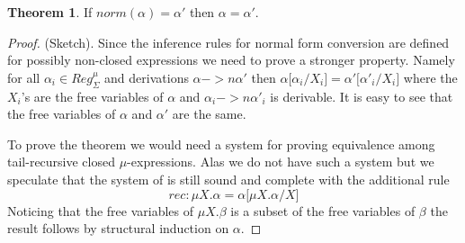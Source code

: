 \documentclass[a4paper, oneside]{memoir}
\theoremstyle{definition}
\newtheorem{theorem}{Theorem}
\begin{document}
\begin{theorem}
  If $norm(\alpha) = \alpha'$ then $\alpha = \alpha'$.

  \begin{proof} (Sketch).
    Since the inference rules for normal form conversion are defined for
    possibly non-closed expressions we need to prove a stronger property. Namely
    for all $\alpha_i \in Reg_{\Sigma}^{\mu}$ and derivations $\alpha ->n \alpha'$
    then $\alpha \lbrack \alpha_i / X_i \rbrack = \alpha' \lbrack \alpha'_i /
    X_i \rbrack$ where the $X_i$'s are the free variables of $\alpha$ and
    $\alpha_i ->n \alpha'_i$ is derivable. It is easy to see that the free
    variables of $\alpha$ and $\alpha'$ are the same.

    To prove the theorem we would need a system for proving equivalence among
    tail-recursive closed $\mu$-expressions. Alas we do not have such a system
    but we speculate that the system of \cite{heni2010} is still sound and
    complete with the additional rule
    \[
    rec : \mu X. \alpha = \alpha \lbrack \mu X. \alpha / X \rbrack
    \]
    Noticing that the free variables of $\mu X. \beta$ is a subset of the free
    variables of $\beta$ the result follows by structural induction on $\alpha$.
  \end{proof}
\end{theorem}
\end{document}
